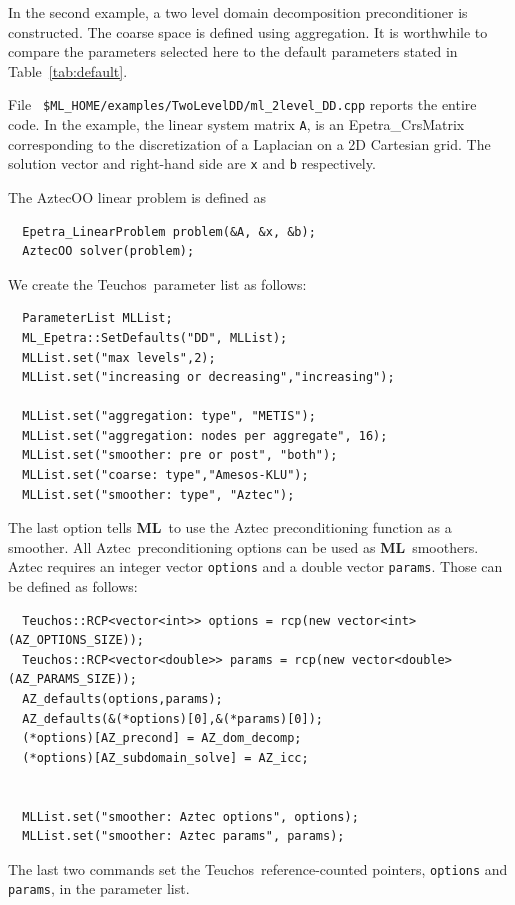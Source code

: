 \documentclass{article}[11pt]
\newcommand{\Aztec}  {{\sc Aztec}}
\newcommand{\ML}     {{\bf ML}}
\newcommand{\teuchos}  {{\sc Teuchos}}
\begin{document}
In the second example, 
a two level domain decomposition preconditioner is constructed.
The coarse space is defined using aggregation. 
It is worthwhile to compare the parameters selected here
to the default parameters stated in Table~\ref{tab:default}.

File {\tt
  \$ML\_HOME/examples/TwoLevelDD/ml\_2level\_DD.cpp}
reports the entire code.  In the example, the linear system matrix
\verb!A!,  is an Epetra\_CrsMatrix corresponding to the
discretization of a Laplacian on a 2D Cartesian grid. 
The solution vector and right-hand side are \verb!x! and \verb!b! respectively.

\noindent
The AztecOO linear problem is defined as
\begin{verbatim}
  Epetra_LinearProblem problem(&A, &x, &b);
  AztecOO solver(problem);
\end{verbatim}

\noindent
We create the \teuchos~parameter  list as follows:
\begin{verbatim}
  ParameterList MLList;
  ML_Epetra::SetDefaults("DD", MLList);
  MLList.set("max levels",2);
  MLList.set("increasing or decreasing","increasing");

  MLList.set("aggregation: type", "METIS");
  MLList.set("aggregation: nodes per aggregate", 16);
  MLList.set("smoother: pre or post", "both");
  MLList.set("coarse: type","Amesos-KLU");
  MLList.set("smoother: type", "Aztec");
\end{verbatim}
The last option tells \ML\ to use the {\sc Aztec} preconditioning
function as a smoother. All \Aztec~preconditioning options can be used
as \ML~smoothers.  {\sc Aztec} requires an integer vector \verb!options!
and a double vector \verb!params!. Those can be defined as follows:
\begin{verbatim}
  Teuchos::RCP<vector<int>> options = rcp(new vector<int>(AZ_OPTIONS_SIZE));
  Teuchos::RCP<vector<double>> params = rcp(new vector<double>(AZ_PARAMS_SIZE));
  AZ_defaults(options,params);
  AZ_defaults(&(*options)[0],&(*params)[0]);
  (*options)[AZ_precond] = AZ_dom_decomp;
  (*options)[AZ_subdomain_solve] = AZ_icc;


  MLList.set("smoother: Aztec options", options);
  MLList.set("smoother: Aztec params", params);
\end{verbatim}
The last two commands set the \teuchos\ reference-counted pointers,
{\tt options} and {\tt params}, in the parameter list.
\end{document}
